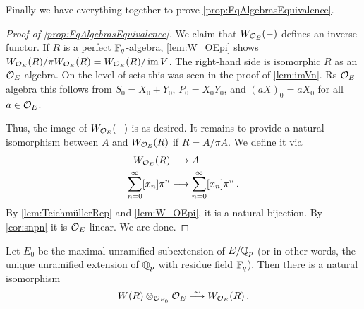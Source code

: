 \documentclass[a4paper, 10pt, oneside, DIV=9, chapterprefix=true, numbers=enddot,bibliography=totoc]{scrbook}
\begin{document}
Finally we have everything together to prove \cref{prop:FqAlgebrasEquivalence}.
\begin{proof}[Proof of \cref{prop:FqAlgebrasEquivalence}]
	We claim that $W_{\mathcal{O}_E}(-)$ defines an inverse functor. If $R$ is a perfect $\mathbb{F}_q$-algebra, \cref{lem:W_OEpi} shows $W_{\mathcal{O}_E}(R)/\pi W_{\mathcal{O}_E}(R)= W_{\mathcal{O}_E}(R)/\operatorname{im} V$. The right-hand side is isomorphic $R$ as an $\mathcal{O}_E$-algebra. On the level of sets this was seen in the proof of \cref{lem:imVn}. Rs $\mathcal{O}_E$-algebra this follows from $S_0=X_0+Y_0$, $P_0=X_0Y_0$, and $(aX)_0=aX_0$ for all $a\in\mathcal{O}_E$.
	
	Thus, the image of $W_{\mathcal{O}_E}(-)$ is as desired. It remains to provide a natural isomorphism between $A$ and $W_{\mathcal{O}_E}(R)$ if $R=A/\pi A$. We define it via
	\begin{align*}
		W_{\Oo_E}(R)&\morphism A\\
		\sum_{n=0}^\infty[x_n]\pi^n&\longmapsto\sum_{n=0}^\infty[x_n]\pi^n\,.
	\end{align*}
	By \cref{lem:TeichmüllerRep} and \cref{lem:W_OEpi}, it is a natural bijection. By \cref{cor:snpn} it is $\mathcal{O}_E$-linear. We are done.
\end{proof}
\begin{cor}\label{cor:unramifiedWitt}
	Let $E_0$ be the maximal unramified subextension of $E/\mathbb{Q}_p$ (or in other words, the unique unramified extension of $\mathbb{Q}_p$ with residue field $\mathbb{F}_q$). Then there is a natural isomorphism
	\begin{equation*}
		W(R)\otimes_{\Oo_{E_0}}\Oo_E\isomorphism W_{\Oo_E}(R)\,.
	\end{equation*}
\end{cor}
\end{document}
